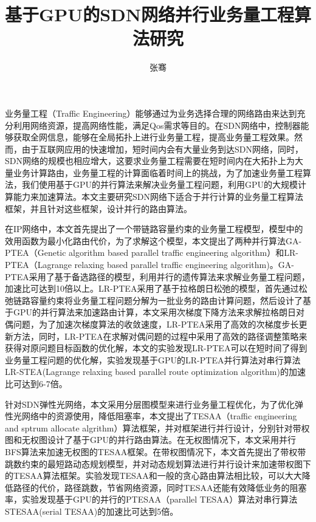 \documentclass[master]{thesis-uestc}
\title{基于GPU的SDN网络并行业务量工程算法研究}
\author{张骞}
\begin{document}
\begin{chineseabstract}
业务量工程（Traffic Engineering）能够通过为业务选择合理的网络路由来达到充分利用网络资源，提高网络性能，满足Qos需求等目的。在SDN网络中，控制器能够获取全网信息，能够在全局拓扑上进行业务量工程，提高业务量工程效果。然而，由于互联网应用的快速增加，短时间内会有大量业务到达SDN网络，同时，SDN网络的规模也相应增大，这要求业务量工程需要在短时间内在大拓扑上为大量业务计算路由，业务量工程的计算面临着时间上的挑战，为了加速业务量工程算法，我们使用基于GPU的并行算法来解决业务量工程问题，利用GPU的大规模计算能力来加速算法。本文主要研究SDN网络下适合于并行计算的业务量工程算法框架，并且针对这些框架，设计并行的路由算法。

在IP网络中，本文首先提出了一个带链路容量约束的业务量工程模型，模型中的效用函数为最小化路由代价，为了求解这个模型，本文提出了两种并行算法GA-PTEA（Genetic algorithm based parallel traffic engineering algorithm）和LR-PTEA（Lagrange relaxing based parallel traffic engineering algorithm)。GA-PTEA采用了基于备选路径的模型，利用并行的遗传算法来求解业务量工程问题，加速比可达到10倍以上。LR-PTEA采用了基于拉格朗日松弛的模型，首先通过松弛链路容量约束将业务量工程问题分解为一批业务的路由计算问题，然后设计了基于GPU的并行算法来加速路由计算，本文采用次梯度下降方法来求解拉格朗日对偶问题，为了加速次梯度算法的收敛速度，LR-PTEA采用了高效的次梯度步长更新方法，同时，LR-PTEA在求解对偶问题的过程中采用了高效的路径调整策略来获得对原问题目标函数的优化解，本文的实验发现LR-PTEA可以在短时间了得到业务量工程问题的优化解，实验发现基于GPU的LR-PTEA并行算法对串行算法LR-STEA(Lagrange relaxing based parallel route optimization algorithm)的加速比可达到6-7倍。

针对SDN弹性光网络，本文采用分层图模型来进行业务量工程优化，为了优化弹性光网络中的资源使用，降低阻塞率，本文提出了TESAA（traffic engineering and sptrum allocate algrithm）算法框架，并对框架进行并行设计，分别针对带权图和无权图设计了基于GPU的并行路由算法。在无权图情况下，本文采用并行BFS算法来加速无权图的TESAA框架。在带权图情况下，本文首先提出了带权带跳数约束的最短路动态规划模型，并对动态规划算法进行并行设计来加速带权图下的TESAA算法框架。实验发现TESAA和一般的贪心路由算法相比较，可以大大降低路径的代价，路径跳数，节省网络资源，同时TESAA还能有效降低业务的阻塞率，实验发现基于GPU的并行的PTESAA（parallel TESAA）算法对串行算法STESAA(serial TESAA)的加速比可达到5倍。

\end{chineseabstract}
\end{document}
